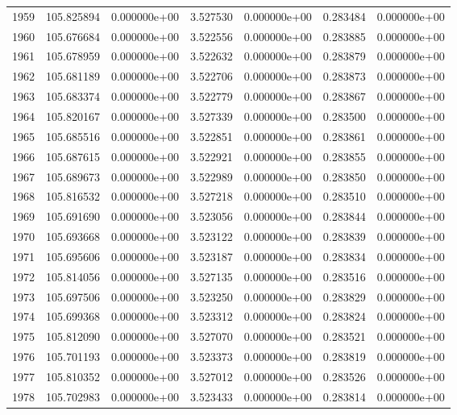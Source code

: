 \begin{tabular}{rrrrrrr}
1959 & 105.825894 &  0.000000e+00 &  3.527530 &  0.000000e+00 &    0.283484 &  0.000000e+00 \\
1960 & 105.676684 &  0.000000e+00 &  3.522556 &  0.000000e+00 &    0.283885 &  0.000000e+00 \\
1961 & 105.678959 &  0.000000e+00 &  3.522632 &  0.000000e+00 &    0.283879 &  0.000000e+00 \\
1962 & 105.681189 &  0.000000e+00 &  3.522706 &  0.000000e+00 &    0.283873 &  0.000000e+00 \\
1963 & 105.683374 &  0.000000e+00 &  3.522779 &  0.000000e+00 &    0.283867 &  0.000000e+00 \\
1964 & 105.820167 &  0.000000e+00 &  3.527339 &  0.000000e+00 &    0.283500 &  0.000000e+00 \\
1965 & 105.685516 &  0.000000e+00 &  3.522851 &  0.000000e+00 &    0.283861 &  0.000000e+00 \\
1966 & 105.687615 &  0.000000e+00 &  3.522921 &  0.000000e+00 &    0.283855 &  0.000000e+00 \\
1967 & 105.689673 &  0.000000e+00 &  3.522989 &  0.000000e+00 &    0.283850 &  0.000000e+00 \\
1968 & 105.816532 &  0.000000e+00 &  3.527218 &  0.000000e+00 &    0.283510 &  0.000000e+00 \\
1969 & 105.691690 &  0.000000e+00 &  3.523056 &  0.000000e+00 &    0.283844 &  0.000000e+00 \\
1970 & 105.693668 &  0.000000e+00 &  3.523122 &  0.000000e+00 &    0.283839 &  0.000000e+00 \\
1971 & 105.695606 &  0.000000e+00 &  3.523187 &  0.000000e+00 &    0.283834 &  0.000000e+00 \\
1972 & 105.814056 &  0.000000e+00 &  3.527135 &  0.000000e+00 &    0.283516 &  0.000000e+00 \\
1973 & 105.697506 &  0.000000e+00 &  3.523250 &  0.000000e+00 &    0.283829 &  0.000000e+00 \\
1974 & 105.699368 &  0.000000e+00 &  3.523312 &  0.000000e+00 &    0.283824 &  0.000000e+00 \\
1975 & 105.812090 &  0.000000e+00 &  3.527070 &  0.000000e+00 &    0.283521 &  0.000000e+00 \\
1976 & 105.701193 &  0.000000e+00 &  3.523373 &  0.000000e+00 &    0.283819 &  0.000000e+00 \\
1977 & 105.810352 &  0.000000e+00 &  3.527012 &  0.000000e+00 &    0.283526 &  0.000000e+00 \\
1978 & 105.702983 &  0.000000e+00 &  3.523433 &  0.000000e+00 &    0.283814 &  0.000000e+00 \\

\end{tabular}
